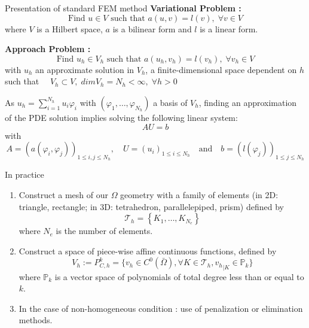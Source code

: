 \documentclass[compress,10pt,xcolor={table,dvipsnames},t]{beamer}
\begin{document}
	\begin{frame}{Presentation of standard FEM method}	
		\textbf{Variational Problem :} 
		\begin{equation*}
			\text{Find } u\in V \text{ such that } a(u,v)=l(v), \;\forall v\in V
		\end{equation*}
		where $V$ is a Hilbert space, $a$ is a bilinear form and $l$ is a linear form.
		
		\textbf{Approach Problem :} 
		\begin{equation*}
			\text{Find } u_h\in V_h \text{ such that } a(u_h,v_h)=l(v_h), \;\forall v_h\in V
		\end{equation*}
		with $u_h$ an approximate solution in $V_h$, a finite-dimensional space dependent on $h$ such that $\quad V_h\subset V, \; dimV_h = N_h<\infty, \; \forall h>0$ 
		
		As $u_h=\sum_{i=1}^{N_h}u_i\varphi_i$ with $(\varphi_1,\dots,\varphi_{N_h})$ a basis of $V_h$, finding an approximation of the PDE solution implies solving the following linear system:
		\begin{equation*}
			AU=b
		\end{equation*}
		with
		\begin{equation*}
			A=(a(\varphi_i,\varphi_j))_{1\le i,j\le N_h}, \quad U=(u_i)_{1\le i\le N_h} \quad \text{and} \quad b=(l(\varphi_j))_{1\le j\le N_h}
		\end{equation*}
	\end{frame}

	\begin{frame}{In practice}
		\begin{enumerate}[\ding{217}]
			\item \begin{minipage}[t]{0.68\linewidth}
				Construct a mesh of our $\Omega$ geometry with a family of elements (in 2D: triangle, rectangle; in 3D: tetrahedron, parallelepiped, prism) defined by
				$$\mathcal{T}_h = \left\{K_1,\dots,K_{N_e}\right\}$$
				where $N_e$ is the number of elements. \\
			\end{minipage} \begin{minipage}[t][][b]{0.28\linewidth}
				\centering
				\qquad {}
			\end{minipage}
			\item Construct a space of piece-wise affine continuous functions, defined by
			\begin{equation*}
				V_h:=P_{C,h}^k=\{v_h\in C^0(\bar{\Omega}), \forall K\in\mathcal{T}_h, {v_h}_{|K}\in\mathbb{P}_k\}
			\end{equation*}
			where $\mathbb{P}_k$ is a vector space of polynomials of total degree less than or equal to $k$.
			\item In the case of non-homogeneous condition : use of penalization or elimination methods.
		\end{enumerate}
		
	\end{frame}
\end{document}
